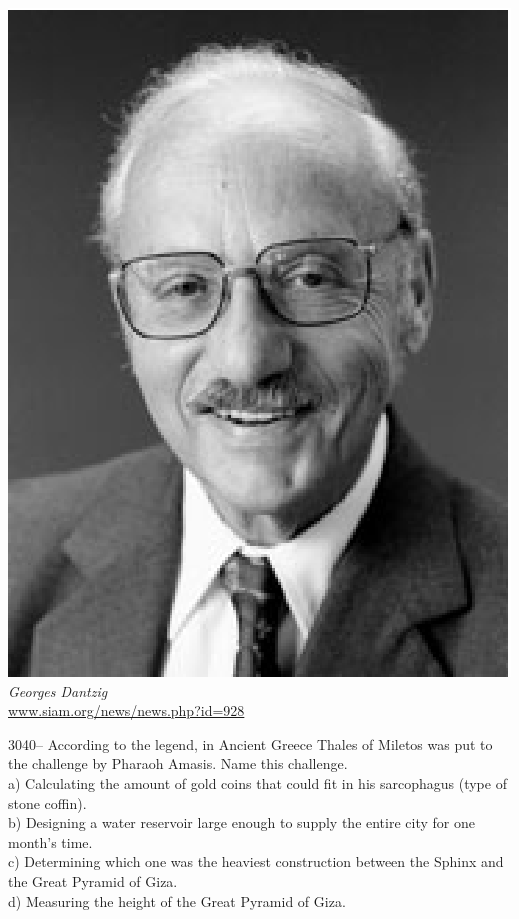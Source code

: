 \documentclass[letterpaper, 12pt]{article}
\begin{document}
\begin{center}
\includegraphics[scale=0.3]{dantzig.eps}\\
\emph{{\small Georges Dantzig}}\\
\href{http://www.siam.org/news/news.php?id=928}{www.siam.org/news/news.php?id=928}\\[5mm]
\end{center}



3040-- According to the legend, in Ancient Greece Thales of Miletos was put to the challenge by Pharaoh Amasis. Name this challenge.\\

a) Calculating the amount of gold coins that could fit in his sarcophagus (type of stone coffin).\\
b) Designing a water reservoir large enough to supply the entire city for one month's time.\\
c) Determining which one was the heaviest construction between the Sphinx and the Great Pyramid of Giza.\\
d) Measuring the height of the Great Pyramid of Giza.\\
\end{document}
